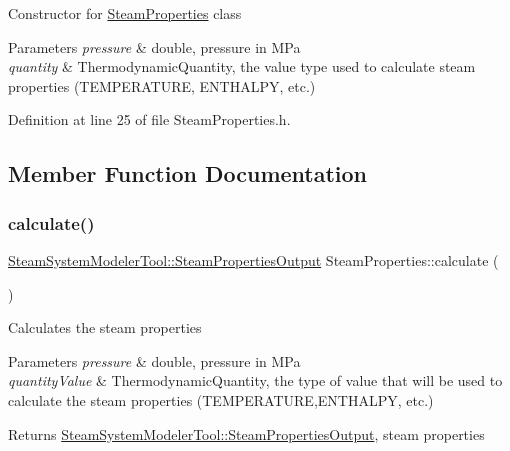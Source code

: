 Constructor for \hyperlink{class_steam_properties}{Steam\+Properties} class 
\begin{DoxyParams}{Parameters}
{\em pressure} & double, pressure in M\+Pa \\
\hline
{\em quantity} & Thermodynamic\+Quantity, the value type used to calculate steam properties (T\+E\+M\+P\+E\+R\+A\+T\+U\+RE, E\+N\+T\+H\+A\+L\+PY, etc.) \\
\hline
\end{DoxyParams}


Definition at line 25 of file Steam\+Properties.\+h.



\subsection{Member Function Documentation}
\mbox{\label{class_steam_properties_a8c729e006c34157435d5476fb31e30b5}} 
\subsubsection{\texorpdfstring{calculate()}{calculate()}\hspace{0.1cm}{\footnotesize\ttfamily [1/3]}}
{\footnotesize\ttfamily \hyperlink{struct_steam_system_modeler_tool_1_1_steam_properties_output}{Steam\+System\+Modeler\+Tool\+::\+Steam\+Properties\+Output} Steam\+Properties\+::calculate (\begin{DoxyParamCaption}{ }\end{DoxyParamCaption})}

Calculates the steam properties


\begin{DoxyParams}{Parameters}
{\em pressure} & double, pressure in M\+Pa \\
\hline
{\em quantity\+Value} & Thermodynamic\+Quantity, the type of value that will be used to calculate the steam properties (T\+E\+M\+P\+E\+R\+A\+T\+U\+RE,E\+N\+T\+H\+A\+L\+PY, etc.)\\
\hline
\end{DoxyParams}
\begin{DoxyReturn}{Returns}
\hyperlink{struct_steam_system_modeler_tool_1_1_steam_properties_output}{Steam\+System\+Modeler\+Tool\+::\+Steam\+Properties\+Output}, steam properties 
\end{DoxyReturn}


